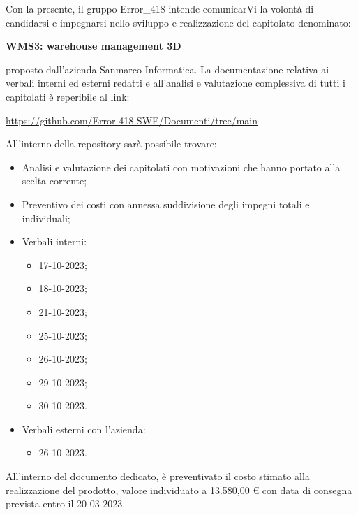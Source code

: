 \documentclass[a4paper, twoside]{article}
\begin{document}
\large

\newpage %



\noindent
Con la presente, il gruppo Error\_418 intende comunicarVi la volontà di candidarsi e impegnarsi nello sviluppo e realizzazione del capitolato denominato:
\begin{center}
\textbf{WMS3: warehouse management 3D}
\end{center}
proposto dall'azienda Sanmarco Informatica. La documentazione relativa ai verbali interni ed 
esterni redatti e all'analisi e valutazione complessiva di tutti i capitolati è reperibile 
al link: 
\begin{center}
    \Large
\url{https://github.com/Error-418-SWE/Documenti/tree/main}
\end{center}

\vspace{0.5cm}
\noindent
All'interno della repository sarà possibile trovare:
\begin{itemize}
    \item Analisi e valutazione dei capitolati con motivazioni che hanno portato alla scelta corrente;
    \item Preventivo dei costi con annessa suddivisione degli impegni totali e individuali;
    \item Verbali interni:
    \begin{itemize}
        \item 17-10-2023;
        \item 18-10-2023;
        \item 21-10-2023;
        \item 25-10-2023;
        \item 26-10-2023;
        \item 29-10-2023;
        \item 30-10-2023.
    \end{itemize}
    \item Verbali esterni con l'azienda:
    \begin{itemize}
        \item 26-10-2023.
    \end{itemize}
\end{itemize}
All'interno del documento dedicato, è preventivato il costo stimato alla realizzazione del 
prodotto, valore individuato a 13.580,00 € con data di consegna prevista entro il 20-03-2023.
\end{document}
